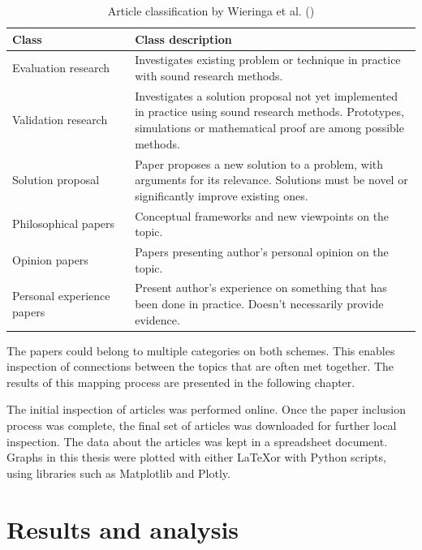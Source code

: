 \documentclass[utf8,english]{gradu3}
\begin{document}
\begin{table}[H]
  \footnotesize
  \centering
  \begin{tabular}{p{0.30\linewidth} p{0.70\linewidth}}

    \textbf{Class}  & \textbf{Class description}  \\ \hline
    Evaluation research & Investigates existing problem or technique in practice with sound research methods. \\ \hline
    Validation research & Investigates a solution proposal not yet implemented in practice using sound research methods. Prototypes, simulations or mathematical proof are among possible methods. \\ \hline
    Solution proposal & Paper proposes a new solution to a problem, with arguments for its relevance. Solutions must be novel or significantly improve existing ones. \\ \hline
    Philosophical papers & Conceptual frameworks and new viewpoints on the topic. \\ \hline
    Opinion papers & Papers presenting author's personal opinion on the topic. \\ \hline
    Personal experience papers & Present author's experience on something that has been done in practice. Doesn't necessarily provide evidence. \\ \hline

  \end{tabular}
  \caption{Article classification by Wieringa et al. (\cite*{wieringa2006})}
  \label{table:wieringa}
\end{table}

The papers could belong to multiple categories on both schemes. This enables
inspection of connections between the topics that are often met together. The
results of this mapping process are presented in the following chapter.

The initial inspection of articles was performed online. Once the paper
inclusion process was complete, the final set of articles was downloaded for
further local inspection. The data about the articles was kept in a spreadsheet
document. Graphs in this thesis were plotted with either \LaTeX or with Python
scripts, using libraries such as Matplotlib and Plotly.


\chapter{Results and analysis}
\label{chap:results}
\end{document}
